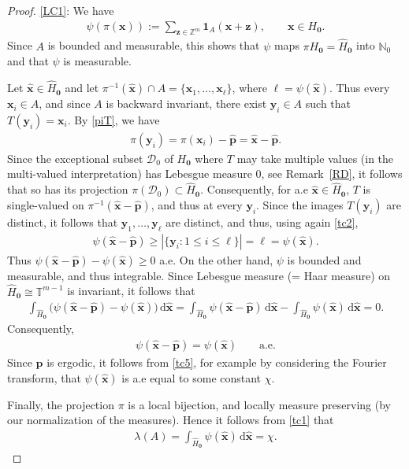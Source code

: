 \documentclass[11pt,reqno,tbtags,a4paper]{amsart}
\numberwithin{equation}{section}
\renewcommand\le{\leq}
\renewcommand\ge{\geq}
\renewcommand\leq{\leqslant}
\renewcommand\geq{\geqslant}
\theoremstyle{plain}%
\theoremstyle{definition}
\theoremstyle{remark}
\newcommand\pfitemx[1]{\par#1:}
\newcommand\pfitemref[1]{\pfitemx{\ref{#1}}}
\newcommand{\refR}[1]{Remark~\ref{#1}}
\newcommand\set[1]{\ensuremath{\{#1\}}}
\newcommand\bigpar[1]{\bigl(#1\bigr)}
\newcommand\punkt{\xperiod}    %
\newcommand{\aex}{a.e\punkt}
\newcommand\bbN{\mathbb N}
\newcommand\bbT{\mathbb T}
\newcommand\bbZ{\mathbb Z}
\newcommand\gl{\lambda}
\newcommand\cD{\mathcal D}
\newcommand\etta{\boldsymbol1}
\newcommand\qw{^{-1}}
\newcommand\dd{\,\mathrm{d}}
\newcommand\Ho{H_{\0}}
\newcommand\hHo{\hH_{\0}}
\newcommand\vp{\mathbf{p}}
\newcommand\hvp{\hat{\mathbf{p}}}
\newcommand\vx{\mathbf{x}}
\newcommand\vy{\mathbf{y}}
\newcommand\vz{\mathbf{z}}
\newcommand\hvx{\hat{\mathbf{x}}}
\newcommand\hH{\widehat{H}}
\newcommand\bbNo{\bbN_0}
\newcommand\0{{\boldsymbol 0}}
\newcommand\1{{\boldsymbol 1}}
\begin{document}
\begin{proof}
\pfitemref{LC1}
  We have
  \begin{align}\label{tc1}
    \psi(\pi(\vx)):=\sum_{\vz\in\bbZ^m}\etta_A(\vx+\vz),
\qquad \vx\in\Ho.
  \end{align}
Since $A$ is bounded and measurable, this shows that $\psi$ maps 
$\pi\Ho=\hHo$ into
$\bbNo$ and that $\psi$ is measurable.

Let $\hvx\in\hHo$ and let $\pi\qw(\hvx)\cap A=\set{\vx_1,\dots,\vx_\ell}$, where
$\ell=\psi(\hvx)$.
Thus every $\vx_i\in A$, and since $A$ is backward invariant, there exist 
$\vy_i\in A$ such that $T(\vy_i)=\vx_i$. 
By \eqref{piT}, we have
\begin{align}\label{tc2}
\pi(\vy_i)=\pi(\vx_i)-\hvp=\hvx-\hvp.   
\end{align}
Since the exceptional subset $\cD_0$ of $\Ho$ where $T$ may take multiple
values (in the multi-valued interpretation) has Lebesgue measure 0, see
\refR{RD}, 
it follows that so has its projection $\pi(\cD_0)\subset\hHo$.
Consequently, for \aex{} $\hvx\in\hHo$, $T$ is single-valued on
$\pi\qw(\hvx-\hvp)$, and thus at every $\vy_i$. Since the images $T(\vy_i)$
are distinct, it follows that $\vy_1,\dots,\vy_\ell$ are distinct, and thus,
using again \eqref{tc2}, 
\begin{align}\label{tc3}
\psi(\hvx-\hvp)\ge 
|\set{\vy_i:1\le i\le \ell}|
=\ell = \psi(\hvx).  
\end{align}
Thus $\psi(\hvx-\hvp)-\psi(\hvx)\ge0$ \aex. 
On the other hand, $\psi$ is bounded and measurable, and thus integrable.
Since Lebesgue measure (= Haar measure) on $\hHo\cong\bbT^{m-1}$ is
invariant, it follows that
\begin{align}\label{tc4}
  \int_{\hHo} \bigpar{\psi(\hvx-\hvp)-\psi(\hvx)}\dd \hvx 
=
  \int_{\hHo} \psi(\hvx-\hvp)\dd \hvx  -   \int_{\hHo} \psi(\hvx)\dd \hvx 
=0.
\end{align}
Consequently, 
\begin{align}\label{tc5}
\psi(\hvx-\hvp)=\psi(\hvx) 
\qquad \text{a.e.}
\end{align}
 Since $\vp$ is ergodic, it follows from \eqref{tc5}, for example by
considering the Fourier transform, that $\psi(\hvx)$ is \aex{} 
equal to some constant $\chi$.

Finally, the projection $\pi$ is a local bijection, and 
locally measure preserving
(by our normalization of the measures). 
Hence it follows from \eqref{tc1} that
\begin{align}
  \gl(A)=\int_{\hHo}\psi(\hvx)\dd\hvx = \chi.
\end{align}


\end{proof}
\end{document}
